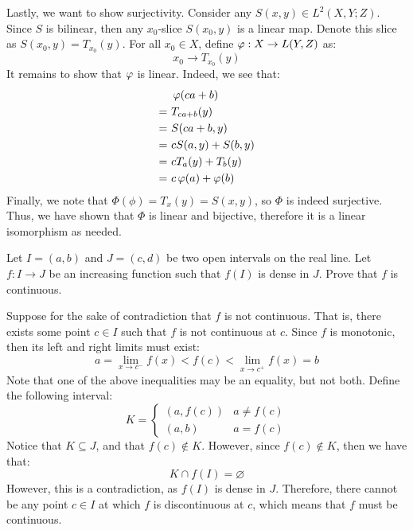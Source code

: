\documentclass{article}
\begin{document}
\begin{soln}
    Lastly, we want to show surjectivity.
    Consider any $ S(x, y) \in L^{2}(X, Y; Z) $.
    Since $ S $ is bilinear, then any $ x_{0} $-slice $ S(x_{0}, y) $ is a linear map.
    Denote this slice as $ S(x_{0}, y) = T_{x_{0}}(y) $. 
    For all $ x_{0} \in X $, define $ \operatorname{\varphi} : X \rightarrow L(Y, Z) $ as:
    \begin{equation*}
        x_{0} \rightarrow T_{x_{0}}(y)
    \end{equation*}
    It remains to show that $ \operatorname{\varphi} $ is linear. Indeed, we see that:
    \begin{align*}
        & \operatorname{\varphi}(ca + b) \\
        = \ & T_{ca + b}(y) \\
        = \ & S(ca + b, y) \\
        = \ & cS(a, y) + S(b, y) \\
        = \ & cT_{a}(y) + T_{b}(y) \\
        = \ & c\operatorname{\varphi}(a) + \operatorname{\varphi}(b)
    \end{align*}
    Finally, we note that $ \Phi(\phi) = T_{x}(y) = S(x, y) $, so $ \Phi $ is indeed surjective.
    Thus, we have shown that $ \Phi $ is linear and bijective,
    therefore it is a linear isomorphism as needed.
\end{soln}

\newpage
{}

\begin{qu}
    Let $ I = (a, b) $ and $ J = (c, d) $ be two open intervals on the real line.
    Let $ f: I \rightarrow J $ be an increasing function such that $ f(I) $ is dense in $ J $.
    Prove that $ f $ is continuous.
\end{qu}

\begin{soln}
    Suppose for the sake of contradiction that $ f $ is not continuous.
    That is, there exists some point $ c \in I $ such that $ f $ is not continuous at $ c $. \vsp
    Since $ f $ is monotonic, then its left and right limits must exist:
    \begin{equation*}
        a = \lim_{x \rightarrow c^{-}}f(x) < f(c) < \lim_{x \rightarrow c^{+}}f(x) = b
    \end{equation*}
    Note that one of the above inequalities may be an equality, but not both. \vsp
    Define the following interval:
    \begin{equation*}
        K = \begin{cases} (a, f(c)) & a \neq f(c) \\ (a, b) & a = f(c) \end{cases}
    \end{equation*}
    Notice that $ K \subseteq J $, and that $ f(c) \notin K $.
    However, since $ f(c) \notin K $, then we have that:
    \begin{equation*}
        K \cap f(I) = \varnothing
    \end{equation*}
    However, this is a contradiction, as $ f(I) $ is dense in $ J $.
    Therefore, there cannot be any point $ c \in I $ at which $ f $ is discontinuous at $ c $,
    which means that $ f $ must be continuous.
\end{soln}
\end{document}
